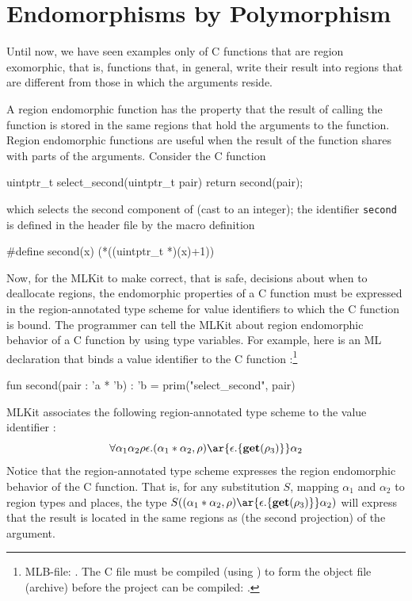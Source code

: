\documentclass[12pt]{book}
\begin{document}
\section{Endomorphisms by Polymorphism}
\label{C_polymorphism.sec}
Until now, we have seen examples only of C functions that are region exomorphic,
that is, functions that, in general, write their result into regions that are
different from those in which the arguments reside.

A region endomorphic function has the property that the result of calling the
function is stored in the same regions that hold the arguments to the
function. Region endomorphic functions are useful when the result of the
function shares with parts of the arguments.  Consider the C function
\begin{scriptcode}
  uintptr_t select_second(uintptr_t pair) {
   return second(pair);
  }
\end{scriptcode}
which selects the second component of  (cast to an integer); the
identifier {\tt second} is defined in the header file  by the
macro definition
\begin{scriptcode}
  #define second(x)  (*((uintptr_t *)(x)+1))
\end{scriptcode}

Now, for the MLKit to make correct, that is safe, decisions about when to
deallocate regions, the endomorphic properties of a C function must be
expressed in the region-annotated type scheme for value identifiers to which the
C function is bound. The programmer can tell the MLKit about region endomorphic
behavior of a C function by using type variables.  For example, here is an ML
declaration that binds a value identifier  to the C function
:\footnote{MLB-file: . The
C file  must be compiled (using ) to form the
object file (archive)  before the project can be
compiled:
%
.}%
%
\begin{smlcode}
  fun second(pair : 'a * 'b) : 'b =
    prim("select_second", pair)
\end{smlcode}
MLKit associates the following region-annotated type scheme to the value
identifier :
$$\forall \alpha_1\alpha_2\rho\epsilon.(\alpha_1 * \alpha_2, \rho)
\ar{\epsilon.\{\Get(\rho_3)\}} \alpha_2$$ Notice that the region-annotated type
scheme expresses the region endomorphic behavior of the C function. That is, for
any substitution $S$, mapping $\alpha_1$ and $\alpha_2$ to region types and
places, the type $S((\alpha_1 * \alpha_2, \rho) \ar{\epsilon.\{\Get(\rho_3)\}}
\alpha_2)$ will express that the result is located in the same regions as (the
second projection) of the argument.
\end{document}
